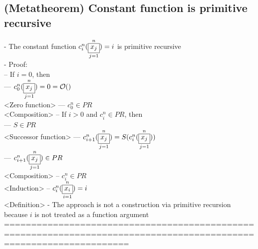 \documentclass{book}
\newcommand{\vdc}[3]{\underset{#2}{\overset{#3}{\fbox{$#1$}}}}
\begin{document}
\subsection{(Metatheorem) Constant function is primitive recursive} %
	- The constant function $c_i^n(\vdc{x_j}{j=1}{n}) = i$ is primitive recursive \\
	- Proof: \\
		-- If $i = 0$, then \\
			--- $c_0^n(\vdc{x_j}{j=1}{n}) = 0 = \mathcal{O}()$ \\ <Zero function>
			--- $c_0^n \in PR$ \\ <Composition> 
		-- If $i > 0$ and $c_i^n \in PR$, then \\
			--- $S \in PR$ \\ <Successor function>
			--- $c_{i+1}^n(\vdc{x_j}{j=1}{n}) = S(c_i^n(\vdc{x_j}{j=1}{n}))$ \\
			--- $c_{i+1}^n(\vdc{x_j}{j=1}{n}) \in PR$ \\ <Composition>
		-- $c_i^n \in PR$ \\ <Induction>
		-- $c_i^n(\vdc{x_i}{i=1}{n}) = i$ \\ <Definition>
	- The approach is not a construction via primitive recursion because $i$ is not treated as a function argument \\
	===================================================================================================================
\end{document}
